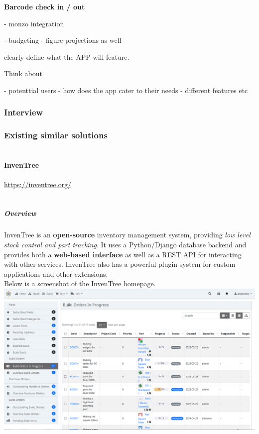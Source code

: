 \documentclass{article}
\begin{document}
\textbf{Barcode check in / out}

- monzo integration

- budgeting - figure projections  as well 

clearly define what the APP will feature.

Think about

- potenttial users
    - how does the app cater to their needs - different features etc




\subsubsection{Interview}

\subsubsection{Existing similar solutions}


\paragraph{\\InvenTree}
\url{https://inventree.org/}

\subparagraph{\\Overview\\}

InvenTree is an \textbf{open-source} inventory management system, providing \textit{low level stock control and part tracking}.
It uses a Python/Django database backend and provides both a \textbf{web-based interface} as well as a REST API for interacting with other services.
InvenTree also has a powerful plugin system for custom applications and other extensions. \\

\noindent Below is a screenshot of the InvenTree homepage.\\
\includegraphics[width=15cm]{inventree_demo_homepage.png}
\end{document}
